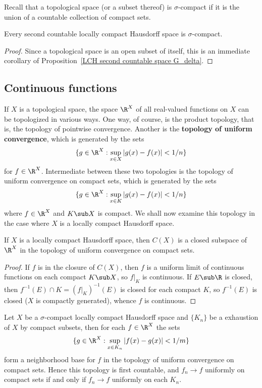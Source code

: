 Recall that a topological space (or a subset thereof) is $\sigma$-compact if it is the union of a countable collection of compact sets.
\begin{corollary}
Every second countable locally compact Hausdorff space is $\sigma$-compact.
\end{corollary}
\begin{proof}
Since a topological space is an open subset of itself, this is an immediate corollary of Proposition~\ref{LCH second countable space G_delta}.
\end{proof}
\subsection{Continuous functions}
If $X$ is a topological space, the space $\R^X$ of all real-valued functions on $X$ can be topologized in various ways. One way, of course, is the product topology, that is, the topology of pointwise convergence. Another is the \textbf{topology of uniform convergence}, which is generated by the sets
\[\{g\in\R^X:\sup_{x\in X}|g(x)-f(x)|<1/n\}\]
for $f\in\R^X$. Intermediate between these two topologies is the topology of uniform convergence on compact sets, which is generated by the sets
\[\{g\in\R^X:\sup_{x\in K}|g(x)-f(x)|<1/n\}\]
where $f\in\R^X$ and $K\sub X$ is compact. We shall now examine this topology in the case where $X$ is a locally compact Hausdorff space.
\begin{proposition}\label{LCH C(X) closed subspace}
If $X$ is a locally compact Hausdorff space, then $C(X)$ is a closed subspace of $\R^X$ in the topology of uniform convergence on compact sets.
\end{proposition}
\begin{proof}
If $f$ is in the closure of $C(X)$, then $f$ is a uniform limit of continuous functions on each compact $K\sub X$, so $f|_K$ is continuous. If $E\sub\R$ is closed, then $f^{-1}(E)\cap K=(f|_K)^{-1}(E)$ is closed for each compact $K$, so $f^{-1}(E)$ is closed ($X$ is compactly generated), whence $f$ is continuous.
\end{proof}
\begin{proposition}\label{LCH sigma-compact uniform converge on compact iff}
Let $X$ be a $\sigma$-compact locally compact Hausdorff space and $\{K_n\}$ be a exhaustion of $X$ by compact subsets, then for each $f\in\R^X$ the sets
\[\{g\in\R^X:\sup_{x\in K_n}|f(x)-g(x)|<1/m\}\]
form a neighborhood base for $f$ in the topology of uniform convergence on compact sets. Hence this topology is first countable, and $f_n\to f$ uniformly on compact sets if and only if $f_n\to f$ uniformly on each $K_n$.
\end{proposition}
